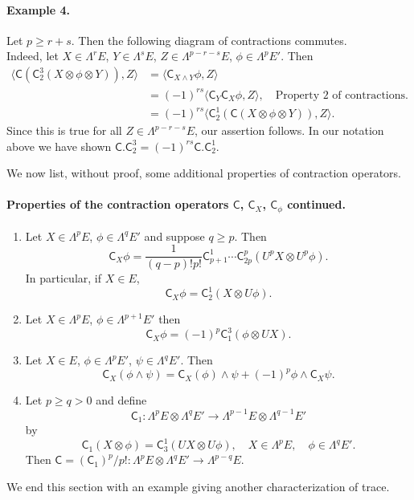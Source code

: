 \paragraph{Example 4.} Let $p\geq r+s$. Then the following diagram of contractions commutes.
\[

\]
Indeed, let $X\in\Lambda^r E$, $Y\in\Lambda^s E$, $Z\in\Lambda^{p-r-s}E$, $\phi\in\Lambda^p E'$. Then
\[
\begin{aligned}
\langle\mathsf C(\mathsf C_2^3(X\otimes\phi\otimes Y)),Z\rangle
&=\langle\mathsf C_{X\wedge Y}\phi,Z\rangle\\
&=(-1)^{rs}\langle\mathsf C_Y\mathsf C_X\phi,Z\rangle,\quad\text{Property 2 of contractions.}\\
&=(-1)^{rs}\langle\mathsf C_2^1(\mathsf C(X\otimes\phi\otimes Y)),Z\rangle.
\end{aligned}
\]
Since this is true for all $Z\in\Lambda^{p-r-s}E$, our assertion follows. In our notation above we have shown $\mathsf C.\mathsf C_2^3=(-1)^{rs}\mathsf C.\mathsf C_2^1$.

We now list, without proof, some additional properties of contraction operators.
\paragraph{Properties of the contraction operators $\mathsf C$, $\mathsf C_X$, $\mathsf C_\phi$ continued.}
\begin{enumerate}[start=5]
\item Let $X\in\Lambda^p E$, $\phi\in\Lambda^q E'$ and suppose $q\geq p$. Then
\[
\mathsf C_X\phi=\frac1{(q-p)!p!}\mathsf C_{p+1}^1\cdots\mathsf C_{2p}^p(U^p X\otimes U^p\phi).
\]
In particular, if $X\in E$,
\[
\mathsf C_X\phi=\mathsf C_2^1(X\otimes U\phi).
\]
\item Let $X\in\Lambda^p E$, $\phi\in\Lambda^{p+1}E'$ then
\[
\mathsf C_X\phi=(-1)^p\mathsf C_1^3(\phi\otimes UX).
\]
\item Let $X\in E$, $\phi\in\Lambda^p E'$, $\psi\in\Lambda^q E'$. Then
\[
\mathsf C_X(\phi\wedge\psi)=\mathsf C_X(\phi)\wedge\psi+(-1)^p\phi\wedge\mathsf C_X\psi.
\]
\item Let $p\geq q>0$ and define
\[
\mathsf C_1:\Lambda^p E\otimes\Lambda^q E'\longrightarrow\Lambda^{p-1}E\otimes\Lambda^{q-1}E'
\]
by
\[
\mathsf C_1(X\otimes\phi)=\mathsf C_3^1(UX\otimes U\phi),\quad X\in\Lambda^p E,\quad\phi\in\Lambda^q E'.
\]
Then $\mathsf C=(\mathsf C_1)^p/p!:\Lambda^p E\otimes\Lambda^q E'\to\Lambda^{p-q}E$.
\end{enumerate}
We end this section with an example giving another characterization of trace.
